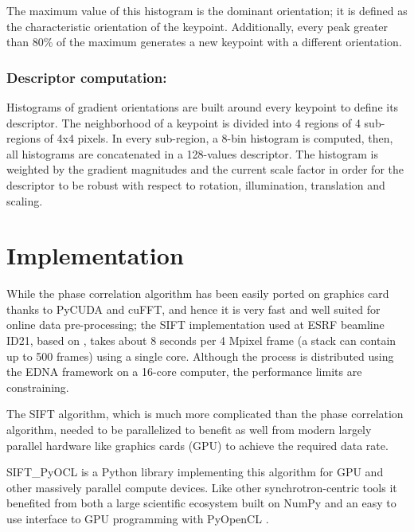 \documentclass[preprint]{iucr}
\begin{document}
The maximum value of this histogram is the dominant orientation; it is defined
as the characteristic orientation of the keypoint.
Additionally, every peak greater than 80\% of the maximum generates a new
keypoint with a different orientation.



\subsubsection{Descriptor computation:}
Histograms of gradient orientations are built around every keypoint to define
its descriptor.
The neighborhood of a keypoint is divided into 4 regions of 4 sub-regions of 4x4
pixels.
In every sub-region, a 8-bin histogram is computed, then, all histograms
are concatenated in a 128-values descriptor.
The histogram is weighted by the gradient magnitudes and the current scale
factor in order for the descriptor to be robust with respect to rotation,
illumination, translation and scaling.


\section{Implementation}

While the phase correlation algorithm has been easily ported on graphics card
thanks to PyCUDA \cite{pyopencl} and cuFFT, and hence it is very fast and well
suited for online data pre-processing;
the SIFT implementation used at ESRF beamline ID21, based on \cite{ASIFT},
takes about 8 seconds per 4 Mpixel frame  (a stack can contain up to  500 frames) using
a single core.
Although the process is distributed using the EDNA framework \cite{edna} on a
16-core computer, the performance limits are constraining.

The SIFT algorithm, which is much more complicated than the phase
correlation algorithm, needed to be parallelized to benefit as well from modern
largely parallel hardware like graphics cards (GPU) to achieve the required
data rate.

SIFT\_PyOCL is a Python library implementing this algorithm for GPU
and other massively parallel compute devices.
Like other synchrotron-centric tools \cite{pyhst2,pynx,pyfai} it benefited
from both a large scientific ecosystem built on NumPy \cite{numpy} and an
easy to use interface to GPU programming with PyOpenCL \cite{pyopencl}.
\end{document}
